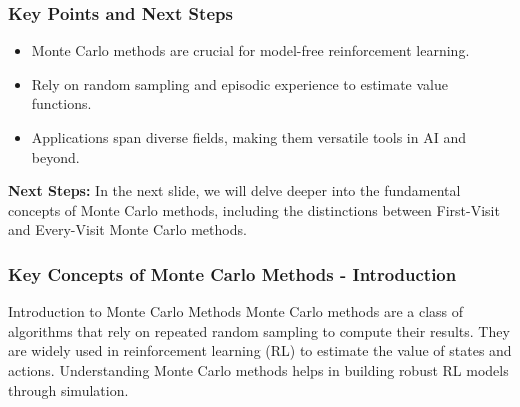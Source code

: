 \documentclass[aspectratio=169]{beamer}
\begin{document}
\begin{frame}[fragile]
    \frametitle{Key Points and Next Steps}
    \begin{itemize}
        \item Monte Carlo methods are crucial for model-free reinforcement learning.
        \item Rely on random sampling and episodic experience to estimate value functions.
        \item Applications span diverse fields, making them versatile tools in AI and beyond.
    \end{itemize}
    
    \textbf{Next Steps:}
    In the next slide, we will delve deeper into the fundamental concepts of Monte Carlo methods, including the distinctions between First-Visit and Every-Visit Monte Carlo methods.
\end{frame}

\begin{frame}[fragile]
    \frametitle{Key Concepts of Monte Carlo Methods - Introduction}
    \begin{block}{Introduction to Monte Carlo Methods}
        Monte Carlo methods are a class of algorithms that rely on repeated random sampling to compute their results. They are widely used in reinforcement learning (RL) to estimate the value of states and actions. Understanding Monte Carlo methods helps in building robust RL models through simulation.
    \end{block}
\end{frame}
\end{document}
